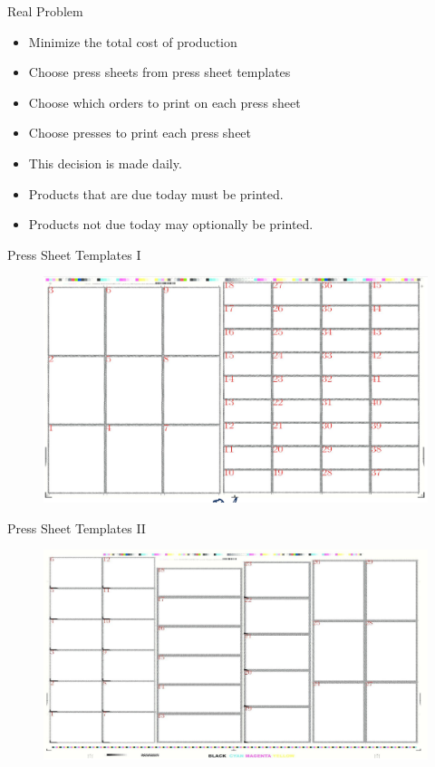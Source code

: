 \documentclass[10pt,utf8,presentation]{beamer}
\begin{document}
\begin{frame}{Real Problem}

\begin{itemize}

\item Minimize the total cost of production
\item Choose press sheets from press sheet templates
\item Choose which orders to print on each press sheet
\item Choose presses to print each press sheet
\item This decision is made daily.
\item Products that are due today must be printed.
\item Products not due today may optionally be printed.
\end{itemize}
 
\end{frame}


\begin{frame}{Press Sheet Templates I}
 
\begin{figure}
\includegraphics[scale=0.3]{fig/template1.png}
\end{figure}

\end{frame}

\begin{frame}{Press Sheet Templates II}
 
\begin{figure}
\includegraphics[scale=0.3]{fig/template2.png}
\end{figure}

\end{frame}
\end{document}
